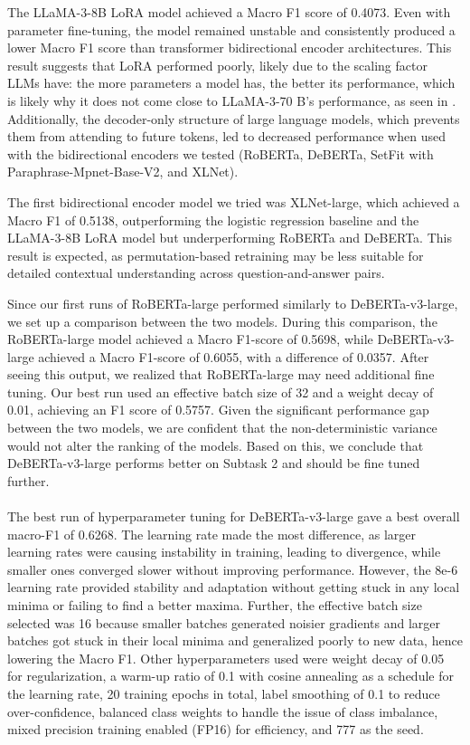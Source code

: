 \documentclass[11pt]{article}
\begin{document}
The LLaMA-3-8B LoRA model achieved a Macro F1 score of 0.4073. Even with parameter fine-tuning, the model remained unstable and consistently produced a lower Macro F1 score than transformer bidirectional encoder architectures. This result suggests that LoRA performed poorly, likely due to the scaling factor LLMs have: the more parameters a model has, the better its performance, which is likely why it does not come close to LLaMA-3-70 B's performance, as seen in \citet{thomas2024isaidthatdataset}. Additionally, the decoder-only structure of large language models, which prevents them from attending to future tokens, led to decreased performance when used with the bidirectional encoders we tested (RoBERTa, DeBERTa, SetFit with Paraphrase-Mpnet-Base-V2, and XLNet).

The first bidirectional encoder model we tried was XLNet-large, which achieved a Macro F1 of 0.5138, outperforming the logistic regression baseline and the LLaMA-3-8B LoRA model but underperforming RoBERTa and DeBERTa. This result is expected, as permutation-based retraining may be less suitable for detailed contextual understanding across question-and-answer pairs.

Since our first runs of  RoBERTa-large performed similarly to DeBERTa-v3-large, we set up a comparison between the two models. During this comparison, the RoBERTa-large model achieved a Macro F1-score of 0.5698, while DeBERTa-v3-large achieved a Macro F1-score of 0.6055, with a difference of 0.0357. After seeing this output, we realized that RoBERTa-large may need additional fine tuning. Our best run used an effective batch size of 32 and a weight decay of 0.01, achieving an F1 score of 0.5757. Given the significant performance gap between the two models, we are confident that the non-deterministic variance would not alter the ranking of the models. Based on this, we conclude that DeBERTa-v3-large performs better on Subtask 2 and should be fine tuned further.

\paragraph{}



The best run of hyperparameter tuning for DeBERTa-v3-large gave a best overall macro-F1 of 0.6268. The learning rate made the most difference, as larger learning rates were causing instability in training, leading to divergence, while smaller ones converged slower without improving performance. However, the 8e-6 learning rate provided stability and adaptation without getting stuck in any local minima or failing to find a better maxima. Further, the effective batch size selected was 16 because smaller batches generated noisier gradients and larger batches got stuck in their local minima and generalized poorly to new data, hence lowering the Macro F1. Other hyperparameters used were weight decay of 0.05 for regularization, a warm-up ratio of 0.1 with cosine annealing as a schedule for the learning rate, 20 training epochs in total, label smoothing of 0.1 to reduce over-confidence, balanced class weights to handle the issue of class imbalance, mixed precision training enabled (FP16) for efficiency, and 777 as the seed.
\end{document}
